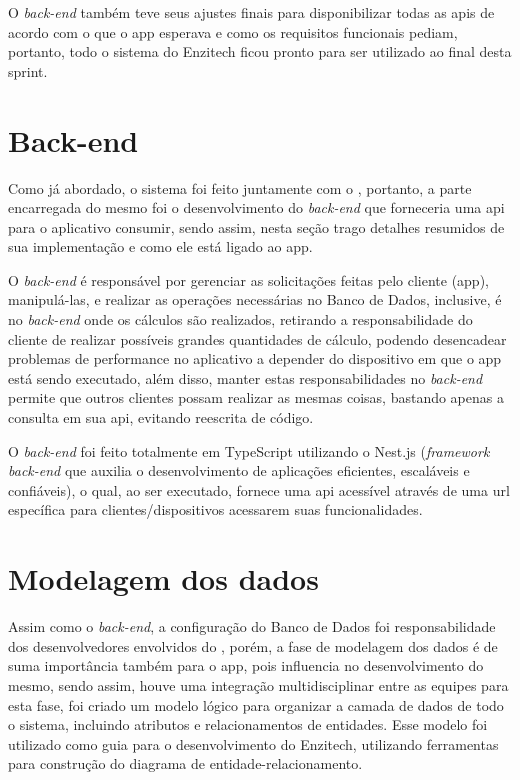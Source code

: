O \textit{back-end} também teve seus ajustes finais para disponibilizar todas as \acp{api} de acordo com o que o app esperava e como os requisitos funcionais pediam, portanto, todo o sistema do Enzitech ficou pronto para ser utilizado ao final desta sprint.

\section{Back-end}
Como já abordado, o sistema foi feito juntamente com o , portanto, a parte encarregada do mesmo foi o desenvolvimento do \textit{back-end} que forneceria uma \ac{api} para o aplicativo consumir, sendo assim, nesta seção trago detalhes resumidos de sua implementação e como ele está ligado ao \ac{app}.

O \textit{back-end} é responsável por gerenciar as solicitações feitas pelo cliente (\ac{app}), manipulá-las, e realizar as operações necessárias no Banco de Dados, inclusive, é no \textit{back-end} onde os cálculos são realizados, retirando a responsabilidade do cliente de realizar possíveis grandes quantidades de cálculo, podendo desencadear problemas de performance no aplicativo a depender do dispositivo em que o \ac{app} está sendo executado, além disso, manter estas responsabilidades no \textit{back-end} permite que outros clientes possam realizar as mesmas coisas, bastando apenas a consulta em sua \ac{api}, evitando reescrita de código.

O \textit{back-end} foi feito totalmente em TypeScript utilizando o Nest.js (\textit{framework back-end} que auxilia o desenvolvimento de aplicações eficientes, escaláveis e confiáveis), o qual, ao ser executado, fornece uma \ac{api} acessível através de uma \ac{url} específica para clientes/dispositivos acessarem suas funcionalidades.

\section{Modelagem dos dados}
Assim como o \textit{back-end}, a configuração do Banco de Dados foi responsabilidade dos desenvolvedores envolvidos do , porém, a fase de modelagem dos dados é de suma importância também para o \ac{app}, pois influencia no desenvolvimento do mesmo, sendo assim, houve uma integração multidisciplinar entre as equipes para esta fase, foi criado um modelo lógico para organizar a camada de dados de todo o sistema, incluindo atributos e relacionamentos de entidades. Esse modelo foi utilizado como guia para o desenvolvimento do Enzitech, utilizando ferramentas para construção do diagrama de entidade-relacionamento.

